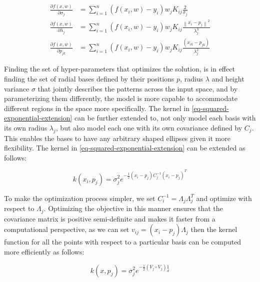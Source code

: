 \documentclass[a4paper,12pt]{article}
\begin{document}
\begin{subequations}
\begin{align} 
\label{eg-dfds}
\frac{\partial f(x,w)}{\partial \sigma_{j}} &= \sum_{i=1}^{n}\left(f(x_{i},w)-y_{i}\right)w_{j}K_{ij}\frac{2}{\sigma_{j}} \\ 
\label{eg-dfdl}
\frac{\partial f(x,w)}{\partial \lambda_{j}} &= \sum_{i=1}^{n}\left(f(x_{i},w)-y_{i}\right)w_{j}K_{ij}\frac{\left\| x_{i}-p_{j}\right\|^{2}}{\lambda_{j}^{3}}\\
\label{eg-dfdp}
\frac{\partial f(x,w)}{\partial p_{jk}} &= \sum_{i=1}^{n}\left(f(x_{i},w)-y_{i}\right)w_{j}K_{ij}\frac{(x_{ik}-p_{jk})}{\lambda_{j}^{2}}
\end{align}
\end{subequations}


Finding the set of hyper-parameters that optimizes the solution, is in effect finding the set of radial bases defined by their positions $p$, radius $\lambda$ and height variance $\sigma$ that jointly describes the patterns across the input space, and by parameterizing them differently, the model is more capable to accommodate different regions in the space more specifically. The kernel in \eqref{eq-squared-exponential-extension} can be further extended to, not only model each basis with its own radius $\lambda_{j}$, but also model each one with its own covariance defined by $C_{j}$. This enables the bases to have any arbitrary shaped ellipses given it more flexibility. The kernel in \eqref{eq-squared-exponential-extension} can be extended as follows:


\begin{equation}
\label{eq-squared-exponential-covariance-extension}
k(x_{i},p_{j}) = \sigma_{j}^{2}e^{-\frac{1}{2}\left(x_{i}-p_{j}\right)C_{j}^{-1}\left(x_{i}-p_{j}\right)^{T}}
\end{equation}

To make the optimization process simpler, we set $C_{i}^{-1}=\Lambda_{j}\Lambda_{j}^{T}$ and optimize with respect to $\Lambda_{j}$. Optimizing the objective in this manner ensures that the covariance matrix is positive semi-definite and makes it faster from a computational perspective, as we can set $v_{ij}=\left(x_{i}-p_{j}\right)\Lambda_{j}$ then the kernel function for all the points with respect to a particular basis can be computed more efficiently as follows:

\begin{equation}
\label{eq-squared-exponential-covariance-extension-simplified}
k(x,p_{j}) = \sigma_{j}^{2}e^{-\frac{1}{2}\left(V_{j}\circ V_{j}\right)\underset{d}{1}}
\end{equation}
\end{document}
